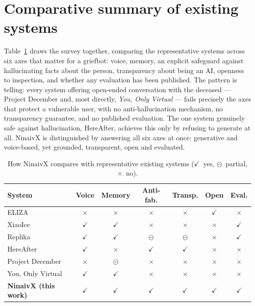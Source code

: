 \documentclass[11pt,a4paper]{report}
\let\amscheckmark\checkmark
\renewcommand{\checkmark}{\ensuremath{\amscheckmark}}
\begin{document}
\section{Comparative summary of existing systems}
\label{sec:compare}
Table~\ref{tab:compare} draws the survey together, comparing the representative systems across six axes that matter for a griefbot: voice, memory, an explicit safeguard against hallucinating facts about the person, transparency about being an AI, openness to inspection, and whether any evaluation has been published. The pattern is telling: every system offering open-ended conversation with the deceased --- Project December and, most directly, \emph{You, Only Virtual} --- fails precisely the axes that protect a vulnerable user, with no anti-hallucination mechanism, no transparency guarantee, and no published evaluation. The one system genuinely safe against hallucination, HereAfter, achieves this only by refusing to generate at all. NinaivX is distinguished by answering all six axes at once: generative and voice-based, yet grounded, transparent, open and evaluated.

\begin{table}[htbp]
\centering
\caption{How NinaivX compares with representative existing systems (\checkmark~yes, $\circleddash$~partial, $\times$~no).}
\label{tab:compare}
\small
\begin{tabularx}{\linewidth}{@{}Xcccccc@{}}
\toprule
\textbf{System} & \textbf{Voice} & \textbf{Memory} & \textbf{Anti-fab.} & \textbf{Transp.} & \textbf{Open} & \textbf{Eval.} \\
\midrule
ELIZA \cite{weizenbaum1966eliza}              & $\times$    & $\times$    & $\times$     & $\times$    & \checkmark  & $\times$ \\
XiaoIce \cite{zhou2020xiaoice}                & \checkmark  & \checkmark  & $\times$     & $\times$    & $\times$    & \checkmark \\
Replika \cite{replika}                        & \checkmark  & \checkmark  & $\circleddash$ & $\circleddash$ & $\times$ & \checkmark \\
HereAfter \cite{hereafter}                    & \checkmark  & $\times$    & \checkmark   & \checkmark  & $\times$    & $\times$ \\
Project December \cite{fagone2021jessica}     & $\times$    & $\circleddash$ & $\times$  & $\times$    & $\times$    & $\times$ \\
You, Only Virtual \cite{yov}                  & \checkmark  & \checkmark  & $\times$     & $\times$    & $\times$    & $\times$ \\
\textbf{NinaivX (this work)}                  & \checkmark  & \checkmark  & \checkmark   & \checkmark  & \checkmark  & \checkmark \\
\bottomrule
\end{tabularx}
\end{table}
\end{document}
